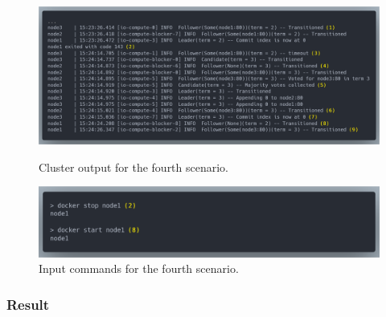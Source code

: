 \begin{figure}[!ht]
\centering
\includegraphics[width=500pt]{images/scenario_4_cluster.png}
\caption{Cluster output for the fourth scenario.}
\label{fig:scenario-4-cluster}
\includegraphics[width=500pt]{images/scenario_4_commands.png}
\caption{Input commands for the fourth scenario.}
\label{fig:scenario-4-commands}
\end{figure}

\subsubsection{Result}

